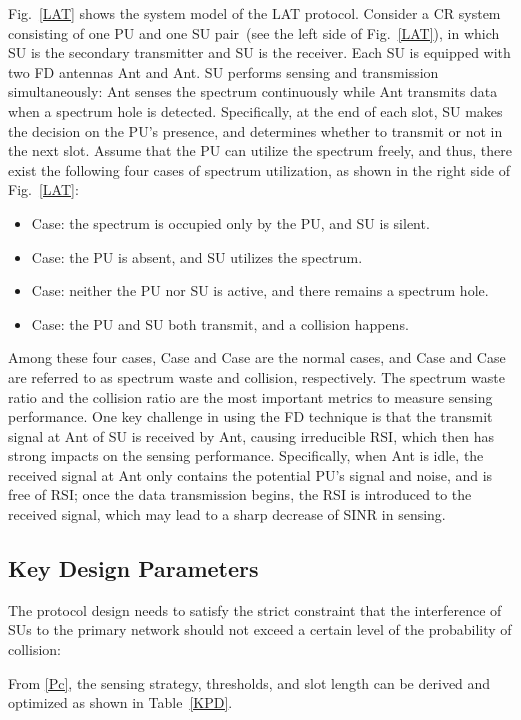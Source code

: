 \documentclass[onecolumn,12pt]{IEEEtran}
\begin{document}
Fig.~\ref{LAT} shows the system model of the LAT protocol. Consider a CR system consisting of one PU and one SU pair~(see the left side of Fig.~\ref{LAT}), in which SU is the secondary transmitter and SU is the receiver. Each SU is equipped with two FD antennas Ant and Ant. SU performs sensing and transmission simultaneously: Ant senses the spectrum continuously while Ant transmits data when a spectrum hole is detected. Specifically, at the end of each slot, SU makes the decision on the PU's presence, and determines whether to transmit or not in the next slot. Assume that the PU can utilize the spectrum freely, and thus, there exist the following four cases of spectrum utilization, as shown in the right side of Fig.~\ref{LAT}:
\begin{itemize}
    \item Case: the spectrum is occupied only by the PU, and SU is silent.
    \item Case: the PU is absent, and SU utilizes the spectrum.
    \item Case: neither the PU nor SU is active, and there remains a spectrum hole.
    \item Case: the PU and SU both transmit, and a collision happens.
\end{itemize}



Among these four cases, Case and Case are the normal cases, and Case and Case are referred to as spectrum waste and collision, respectively. The spectrum waste ratio and the collision ratio are the most important metrics to measure sensing performance. One key challenge in using the FD technique is that the transmit signal at Ant of SU is received by Ant, causing irreducible RSI, which then has strong impacts on the sensing performance. Specifically, when Ant is idle, the received signal at Ant only contains the potential PU's signal and noise, and is free of RSI; once the data transmission begins, the RSI is introduced to the received signal, which may lead to a sharp decrease of SINR in sensing.

\subsection{Key Design Parameters}

The protocol design needs to satisfy the strict constraint that the interference of SUs to the primary network should not exceed a certain level of the probability of collision:

From \eqref{Pc}, the sensing strategy, thresholds, and slot length can be derived and optimized as shown in Table~\ref{KPD}.
\end{document}
